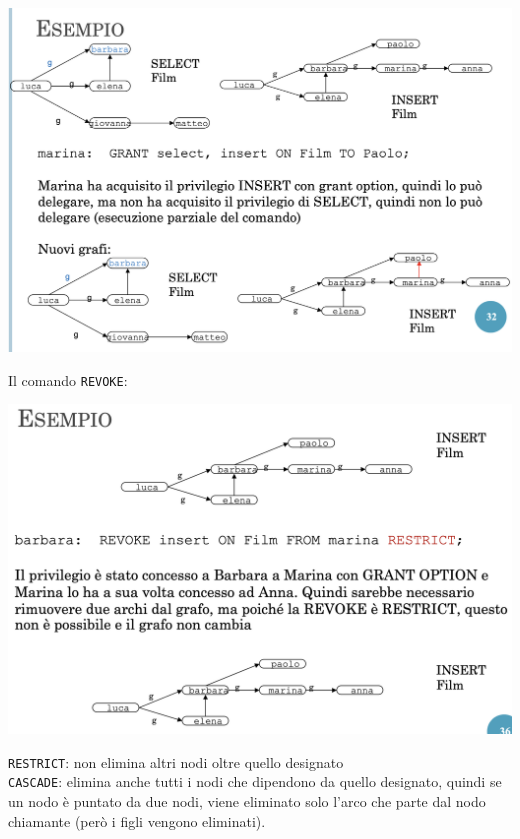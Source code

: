 \documentclass[12pt, a4paper]{report}
\begin{document}
    \begin{center}
        \includegraphics[scale=0.4]{Appunti Latex/Immagini/esempiograntparziale.png}
    \end{center}
    Il comando \texttt{REVOKE}:
    \begin{center}
        \includegraphics[scale=0.4]{Appunti Latex/Immagini/esempiorevoke.png}
    \end{center}
    \texttt{RESTRICT}: non elimina altri nodi oltre quello designato\\
    \texttt{CASCADE}: elimina anche tutti i nodi che dipendono da quello designato, quindi se un nodo è puntato da due nodi, viene eliminato solo l'arco che parte dal nodo chiamante (però i figli vengono eliminati).
\end{document}
